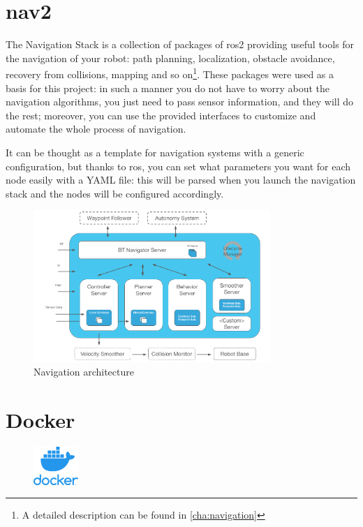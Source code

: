 \section{\acrfull{nav2}}

The Navigation Stack is a collection of packages of \acrshort{ros}2 providing useful tools for the navigation of your robot: path planning, localization, obstacle avoidance, recovery from collisions, mapping and so on\footnote{A detailed description can be found in \autoref{cha:navigation}}. These packages were used as a basis for this project: in such a manner you do not have to worry about the navigation algorithms, you just need to pass sensor information, and they will do the rest; moreover, you can use the provided interfaces to customize and automate the whole process of navigation.

It can be thought as a template for navigation systems with a generic configuration, but thanks to \Acrshort{ros}, you can set what parameters you want for each node easily with a YAML file: this will be parsed when you launch the navigation stack and the nodes will be configured accordingly.

\begin{figure}[h]
    \centering
    \includegraphics[width=0.8\textwidth]{images/nav2_architecture}
    \caption{Navigation architecture}
\end{figure}

\section{Docker}
  
\begin{figure}
    \includegraphics[width=0.15\textwidth]{images/docker}
\end{figure}
  
